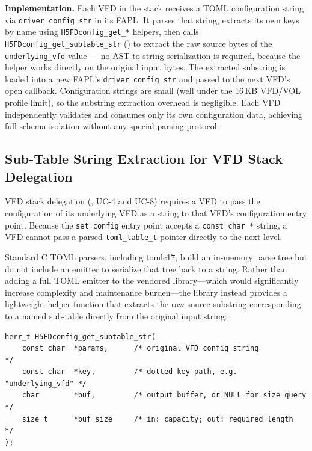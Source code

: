 \documentclass[../RFC-HDFG-2026-001.tex]{subfiles}
\begin{document}
\textbf{Implementation.}  Each VFD in the stack receives a TOML configuration
string via \texttt{driver\_config\_str} in its FAPL.  It parses that string,
extracts its own keys by name using \texttt{H5FDconfig\_get\_*} helpers, then
calls \texttt{H5FDconfig\_get\_subtable\_str} ()
to extract the raw source bytes of the \texttt{underlying\_vfd} value — no
AST-to-string serialization is required, because the helper works directly on
the original input bytes.  The extracted substring is loaded into a new FAPL's
\texttt{driver\_config\_str} and passed to the next VFD's open callback.
Configuration strings are small (well under the 16\,KB VFD/VOL profile limit),
so the substring extraction overhead is negligible.  Each VFD independently
validates and consumes only its own configuration data, achieving full schema
isolation without any special parsing protocol.

\subsection{Sub-Table String Extraction for VFD Stack Delegation}
\label{sec:subtable-extraction}

VFD stack delegation (, UC-4 and UC-8) requires
a VFD to pass the configuration of its underlying VFD as a string to that
VFD's configuration entry point.  Because the \texttt{set\_config} entry point
accepts a \texttt{const char~*} string, a VFD cannot pass a parsed
\texttt{toml\_table\_t} pointer directly to the next level.

Standard C TOML parsers, including tomlc17, build an in-memory parse tree but
do not include an emitter to serialize that tree back to a string.  Rather
than adding a full TOML emitter to the vendored library---which would
significantly increase complexity and maintenance burden---the library instead
provides a lightweight helper function that extracts the raw source substring
corresponding to a named sub-table directly from the original input string:

\begin{verbatim}
herr_t H5FDconfig_get_subtable_str(
    const char  *params,      /* original VFD config string          */
    const char  *key,         /* dotted key path, e.g. "underlying_vfd" */
    char        *buf,         /* output buffer, or NULL for size query   */
    size_t      *buf_size     /* in: capacity; out: required length      */
);
\end{verbatim}
\end{document}
